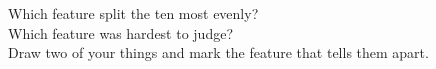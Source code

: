 \vspace{8pt}
Which feature split the ten most evenly? \wline[6cm]\\[10pt]
Which feature was hardest to judge? \wline[6cm]\\[10pt]
Draw two of your things and mark the feature that tells them apart.\par\medskip
{}
\clearpage
